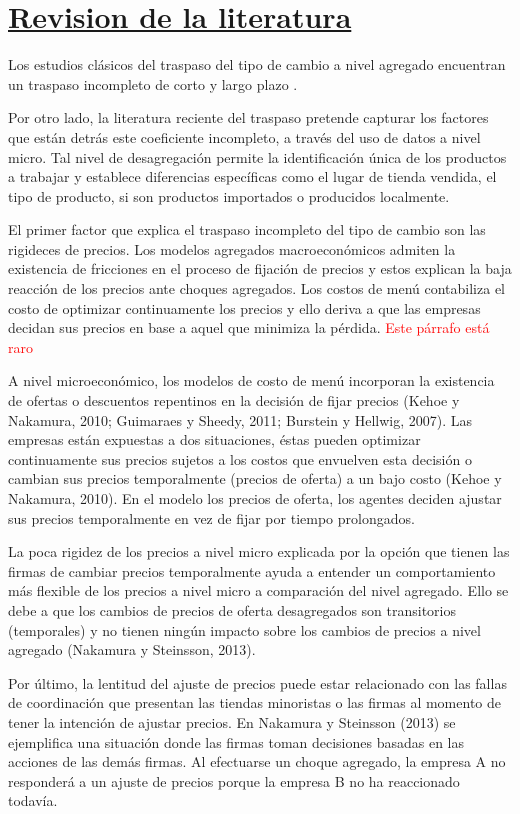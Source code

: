 \documentclass[12pt,a4paper,pdflatex]{article}
\begin{document}
\newpage

\section{\underline{Revision de la literatura}}\label{sec2}
Los estudios clásicos del traspaso del tipo de cambio a nivel agregado encuentran un traspaso incompleto de corto y largo plazo \citep{burstein2014international, bussiere2013exchange}.

Por otro lado, la literatura reciente del traspaso pretende capturar los factores que están detrás este coeficiente incompleto, a través del uso de datos a nivel micro. Tal nivel de desagregación permite la identificación única de los productos a trabajar y establece diferencias específicas como el lugar de tienda vendida, el tipo de producto, si son productos importados o producidos localmente.

El primer factor que explica el traspaso incompleto del tipo de cambio son las rigideces de precios. Los modelos agregados macroeconómicos admiten la existencia de fricciones en el proceso de fijación de precios y estos explican la baja reacción de los precios ante choques agregados. Los costos de menú contabiliza el costo de optimizar continuamente los precios y ello deriva a que las empresas decidan sus precios en base a aquel que minimiza la pérdida. \textcolor{red}{Este párrafo está raro}

A nivel microeconómico, los modelos de costo de menú incorporan la existencia de ofertas o descuentos repentinos en la decisión de fijar precios (Kehoe y Nakamura, 2010; Guimaraes y Sheedy, 2011; Burstein y Hellwig, 2007). Las empresas están expuestas a dos situaciones, éstas pueden optimizar continuamente sus precios sujetos a los costos que envuelven esta decisión o cambian sus precios temporalmente (precios de oferta) a un bajo costo (Kehoe y Nakamura, 2010). En el modelo los precios de oferta, los agentes deciden ajustar sus precios temporalmente en vez de fijar por tiempo prolongados.

La poca rigidez de los precios a nivel micro explicada por la opción que tienen las firmas de cambiar precios temporalmente ayuda a entender un comportamiento más flexible de los precios a nivel micro a comparación del nivel agregado. Ello se debe a que los cambios de precios de oferta desagregados son transitorios (temporales) y no tienen ningún impacto sobre los cambios de precios a nivel agregado (Nakamura y Steinsson, 2013).

Por último, la lentitud del ajuste de precios puede estar relacionado con las fallas de coordinación que presentan las tiendas minoristas o las firmas al momento de tener la intención de ajustar precios. En Nakamura y Steinsson (2013) se ejemplifica una situación donde las firmas toman decisiones basadas en las acciones de las demás firmas. Al efectuarse un choque agregado, la empresa A no responderá a un ajuste de precios porque la empresa B no ha reaccionado todavía.
\end{document}
